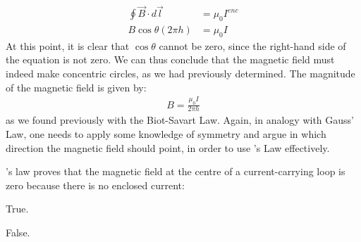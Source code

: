 \begin{align*}
\oint \vec B \cdot d\vec l &=\mu_0 I^{enc}\\
B\cos\theta (2\pi h) &= \mu_0 I
\end{align*} 
At this point, it is clear that $\cos\theta$ cannot be zero, since the right-hand side of the equation is not zero. We can thus conclude that the magnetic field must indeed make concentric circles, as we had previously determined. The magnitude of the magnetic field is given by:
\begin{align*}
B = \frac{\mu_0 I}{2\pi h}
\end{align*}
as we found previously with the Biot-Savart Law. Again, in analogy with Gauss' Law, one needs to apply some knowledge of symmetry and argue in which direction the magnetic field should point, in order to use \ampere's Law effectively. 

\begin{checkpoint}{}
	\begin{MCquestion}{\ampere's law proves that the magnetic field at the centre of a current-carrying loop is zero because there is no enclosed current:}
		\item True.
		\item False. \correct
	\end{MCquestion}
\end{checkpoint}

